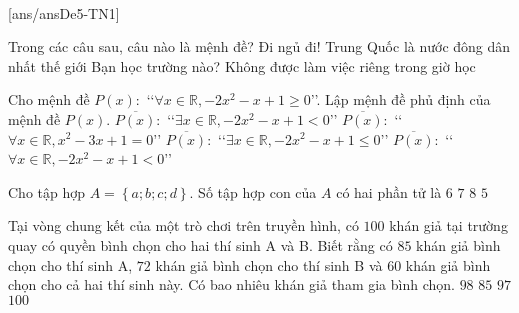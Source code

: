 ﻿﻿\begin{name}
	{\tenchude}
	{\tendethi}
	{\tentruong}
	{\thoigian}
\end{name}
\setcounter{ex}{0}\setcounter{bt}{0}
\TN
{}[ans/ansDe5-TN1]
\begin{ex}%
	Trong các câu sau, câu nào là mệnh đề?
	\choice
	{Đi ngủ đi!}
	{\True Trung Quốc là nước đông dân nhất thế giới}
	{Bạn học trường nào?}
	{Không được làm việc riêng trong giờ học}
\end{ex}

\begin{ex}%
	Cho mệnh đề $P(x)\colon$ \lq\lq $\forall x\in\mathbb{R}, -2x^2-x+1\geq 0$\rq\rq. Lập mệnh đề phủ định của mệnh đề $P(x)$.
	\choice
	{\True $\overline{P(x)}\colon$ \lq\lq $\exists x\in\mathbb{R}, -2x^2-x+1<0$\rq\rq}
	{$\overline{P(x)}\colon$ \lq\lq $\forall x\in\mathbb{R}, x^2-3x+1=0$\rq\rq}
	{$\overline{P(x)}\colon$ \lq\lq $\exists x\in\mathbb{R}, -2x^2-x+1\leq 0$\rq\rq}
	{$\overline{P(x)}\colon$ \lq\lq $\forall x\in\mathbb{R}, -2x^2-x+1<0$\rq\rq}
\end{ex}

\begin{ex}%
	Cho tập hợp $A=\left\{a;b;c;d\right\}$. Số tập hợp con của $A$ có hai phần tử là
	\choice
	{\True $6$}
	{$7$}
	{$8$}
	{$5$}
\end{ex}

\begin{ex}%
	Tại vòng chung kết của một trò chơi trên truyền hình, có $100$ khán giả tại trường quay có quyền bình chọn cho hai thí sinh A và B. Biết rằng có $85$ khán giả bình chọn cho thí sinh A, $72$ khán giả bình chọn cho thí sinh B và $60$ khán giả bình chọn cho cả hai thí sinh này. Có bao nhiêu khán giả tham gia bình chọn.
	\choice
	{$98$}
	{$85$}
	{\True $97$}
	{$100$}
\end{ex}

